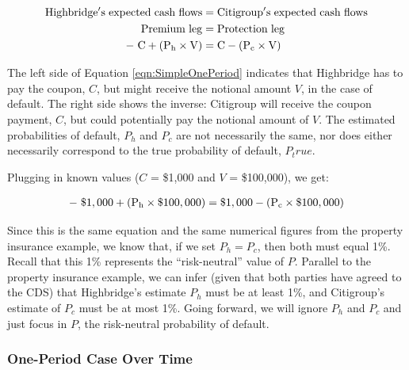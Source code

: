 \documentclass{jss}
\begin{document}
\begin{align}
   \rm Highbridge's\hspace{3pt}expected\hspace{3pt}cash\hspace{3pt}flows &= \rm Citigroup's\hspace{3  pt}expected\hspace{3pt}cash\hspace{3pt}flows \\
   \rm Premium\hspace{3pt}leg &= \rm Protection\hspace{3pt}leg \\
   \rm -\hspace{3pt}C + (P_h \times V)  &= \rm C - (P_c \times V) \label{eqn:SimpleOnePeriod}
\end{align}

The left side of Equation \eqref{eqn:SimpleOnePeriod} indicates that Highbridge has to pay the coupon, $C$, but might receive the notional amount $V$, in the case of default. The right side shows the inverse: Citigroup will receive the coupon payment, $C$, but could potentially pay the notional amount of $V$. The estimated probabilities of default, $P_h$ and $P_c$ are not necessarily the same, nor does either necessarily correspond to the true probability of default, $P_true$.

Plugging in known values ($C$ = \$1,000 and $V$ = \$100,000), we get:

\begin{equation}
 \begin{aligned}
   {\rm -\hspace{3pt}\$1,000 + (P_h \times {\$100,000})  = \$1,000 - (P_c \times {\$100,000})}
    \end{aligned}
\end{equation}

Since this is the same equation and the same numerical figures from the property insurance example, we know that, if we set $P_h = P_c$, then both must equal 1\%. Recall that this 1\% represents the ``risk-neutral'' value of $P$. Parallel to the property insurance example, we can infer (given that both parties have agreed to the CDS) that Highbridge's estimate $P_h$ must be at least 1\%, and Citigroup's estimate of $P_c$ must be at most 1\%. Going forward, we will ignore $P_h$ and $P_c$ and just focus in $P$, the risk-neutral probability of default.


\subsubsection{One-Period Case Over Time}
\label{sec:OnePeriodOverTime}
\end{document}
